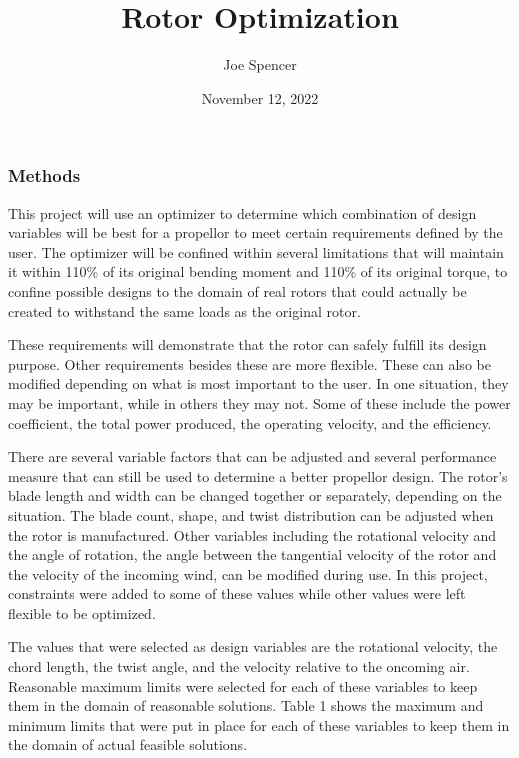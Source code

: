 \documentclass{article}
\begin{document}
\author{Joe Spencer}
\title{Rotor Optimization}
\date{November 12, 2022}
\maketitle

\subsubsection*{Methods}

This project will use an optimizer to determine which combination of design variables will be best for a propellor to meet certain requirements defined by the user. The optimizer will be confined within several limitations that will maintain it within 110\% of its original bending moment and 110\% of its original torque, to confine possible designs to the domain of real rotors that could actually be created to withstand the same loads as the original rotor.

These requirements will demonstrate that the rotor can safely fulfill its design purpose. Other requirements besides these are more flexible. These can also be modified depending on what is most important to the user. In one situation, they may be important, while in others they may not. Some of these include the power coefficient, the total power produced, the operating velocity, and the efficiency. \newline

There are several variable factors that can be adjusted and several performance measure that can still be used to determine a better propellor design. The rotor's blade length and width can be changed together or separately, depending on the situation. The blade count, shape, and twist distribution can be adjusted when the rotor is manufactured. Other variables including the rotational velocity and the angle of rotation, the angle between the tangential velocity of the rotor and the velocity of the incoming wind, can be modified during use. In this project, constraints were added to some of these values while other values were left flexible to be optimized. \newline

The values that were selected as design variables are the rotational velocity, the chord length, the twist angle, and the velocity relative to the oncoming air. Reasonable maximum limits were selected for each of these variables to keep them in the domain of reasonable solutions. Table 1 shows the maximum and minimum limits that were put in place for each of these variables to keep them in the domain of actual feasible solutions. \newline
\end{document}
